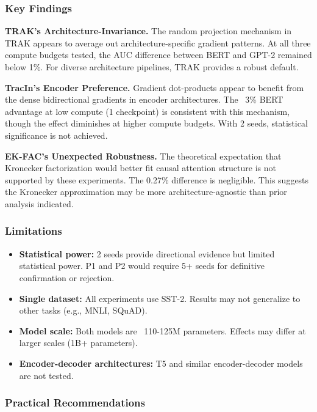 
\subsubsection{Key Findings}

\textbf{TRAK's Architecture-Invariance.} The random projection mechanism in TRAK appears to average out architecture-specific gradient patterns. At all three compute budgets tested, the AUC difference between BERT and GPT-2 remained below 1\%. For diverse architecture pipelines, TRAK provides a robust default.

\textbf{TracIn's Encoder Preference.} Gradient dot-products appear to benefit from the dense bidirectional gradients in encoder architectures. The ~3\% BERT advantage at low compute (1 checkpoint) is consistent with this mechanism, though the effect diminishes at higher compute budgets. With 2 seeds, statistical significance is not achieved.

\textbf{EK-FAC's Unexpected Robustness.} The theoretical expectation that Kronecker factorization would better fit causal attention structure is not supported by these experiments. The 0.27\% difference is negligible. This suggests the Kronecker approximation may be more architecture-agnostic than prior analysis indicated.

\subsubsection{Limitations}

\begin{itemize}
\item \textbf{Statistical power:} 2 seeds provide directional evidence but limited statistical power. P1 and P2 would require 5+ seeds for definitive confirmation or rejection.
\item \textbf{Single dataset:} All experiments use SST-2. Results may not generalize to other tasks (e.g., MNLI, SQuAD).
\item \textbf{Model scale:} Both models are ~110-125M parameters. Effects may differ at larger scales (1B+ parameters).
\item \textbf{Encoder-decoder architectures:} T5 and similar encoder-decoder models are not tested.
\end{itemize}

\subsubsection{Practical Recommendations}

